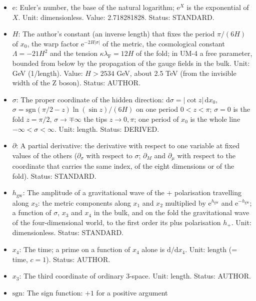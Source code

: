 \documentclass[
  10pt,
]{article}
\providecommand{\tightlist}{%
  \setlength{\itemsep}{0pt}\setlength{\parskip}{0pt}}
\begin{document}
\begin{itemize}
\tightlist
\item
  \(\mathrm{e}\): Euler's number, the base of the natural logarithm;
  \(\mathrm{e}^{X}\) is the exponential of \(X\). Unit: dimensionless.
  Value: 2.718281828. Status: STANDARD.
\item
  \(H\): The author's constant (an inverse length) that fixes the period
  \(\pi/(6H)\) of \(x_0\), the warp factor
  \(\mathrm{e}^{-2H\lvert\sigma\rvert}\) of the metric, the cosmological
  constant \(\Lambda = -21H^2\) and the tension
  \(\kappa\lambda_{\mathrm{F}} = 12H\) of the fold; in UM-4 a free
  parameter, bounded from below by the propagation of the gauge fields
  in the bulk. Unit: GeV (1/length). Value: \(H > 2534\) GeV, about 2.5
  TeV (from the invisible width of the Z boson). Status: AUTHOR.
\item
  \(\sigma\): The proper coordinate of the hidden direction:
  \(\mathrm{d}\sigma = \lvert\cot z\rvert\,\mathrm{d}x_0\),
  \(\sigma = \mathrm{sgn}(\pi/2 - z)\ln(\sin z)/(6H)\) on one period
  \(0 < z < \pi\); \(\sigma = 0\) is the fold \(z = \pi/2\),
  \(\sigma \to \mp\infty\) the tips \(z \to 0, \pi\); one period of
  \(x_0\) is the whole line \(-\infty < \sigma < \infty\). Unit: length.
  Status: DERIVED.
\item
  \(\partial\): A partial derivative: the derivative with respect to one
  variable at fixed values of the others (\(\partial_\sigma\) with
  respect to \(\sigma\); \(\partial_M\) and \(\partial_\mu\) with
  respect to the coordinate that carries the same index, of the eight
  dimensions or of the fold). Status: STANDARD.
\item
  \(h_{\mathrm{gw}}\): The amplitude of a gravitational wave of the +
  polarisation travelling along \(x_3\): the metric components along
  \(x_1\) and \(x_2\) multiplied by \(\mathrm{e}^{h_{\mathrm{gw}}}\) and
  \(\mathrm{e}^{-h_{\mathrm{gw}}}\); a function of \(\sigma\), \(x_3\)
  and \(x_4\) in the bulk, and on the fold the gravitational wave of the
  four-dimensional world, to the first order its plus polarisation
  \(h_{+}\). Unit: dimensionless. Status: STANDARD.
\item
  \(x_4\): The time; a prime on a function of \(x_4\) alone is
  \(\mathrm{d}/\mathrm{d}x_4\). Unit: length (= time, \(c = 1\)).
  Status: AUTHOR.
\item
  \(x_3\): The third coordinate of ordinary 3-space. Unit: length.
  Status: AUTHOR.
\item
  \(\mathrm{sgn}\): The sign function: \(+1\) for a positive argument

\end{itemize}
\end{document}
